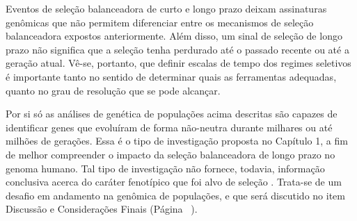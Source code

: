 \begin{refsection}
Eventos de seleção balanceadora de curto e longo prazo deixam assinaturas genômicas que não permitem diferenciar entre os mecanismos de seleção balanceadora expostos anteriormente. Além disso, um sinal de seleção de longo prazo não significa que a seleção tenha perdurado até o passado recente ou até a geração atual. Vê-se, portanto, que definir escalas de tempo dos regimes seletivos é importante tanto no sentido de determinar quais as ferramentas adequadas, quanto no grau de resolução que se pode alcançar. 



Por si só as análises de genética de populações acima descritas são capazes de identificar genes que evoluíram de forma não-neutra durante milhares ou até milhões de gerações. Essa é o tipo de investigação proposta no Capítulo 1, a fim de melhor compreender o impacto da seleção balanceadora de longo prazo no genoma humano. Tal tipo de investigação não fornece, todavia, informação conclusiva acerca do caráter fenotípico que foi alvo de seleção \parencite{Mitchell-Olds2007}. Trata-se de um desafio em andamento na genômica de populações, e que será discutido no item Discussão e Considerações Finais (Página ~\pageref{chap:conclusions}).


\end{refsection}
